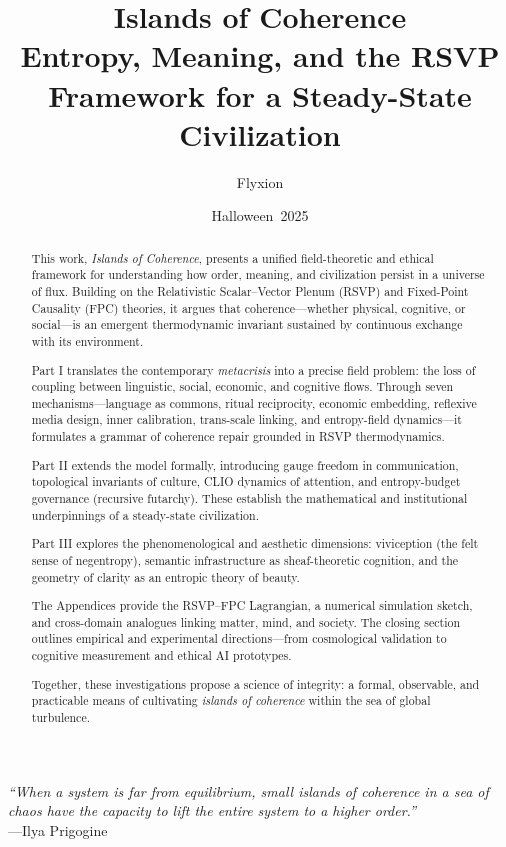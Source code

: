 \documentclass[12pt,a4paper]{article}
\title{\Huge\textbf{Islands of Coherence}\\
       \vspace{0.4em}
       \Large Entropy, Meaning, and the RSVP Framework for a Steady-State Civilization}
\author{Flyxion}
\date{Halloween~2025}
\begin{document}
\maketitle
\thispagestyle{empty}

\begin{center}
\emph{``When a system is far from equilibrium, small islands of coherence in a sea of chaos have the capacity to lift the entire system to a higher order.''}\\
—Ilya Prigogine \cite{prigogine1984order}
\end{center}

\newpage
\begin{abstract}
\noindent This work, \emph{Islands of Coherence}, presents a unified field-theoretic and ethical framework for understanding how order, meaning, and civilization persist in a universe of flux.
Building on the Relativistic Scalar–Vector Plenum (RSVP) and Fixed-Point Causality (FPC) theories, it argues that coherence—whether physical, cognitive, or social—is an emergent thermodynamic invariant sustained by continuous exchange with its environment.

Part I translates the contemporary \emph{metacrisis} into a precise field problem: the loss of coupling between linguistic, social, economic, and cognitive flows.
Through seven mechanisms—language as commons, ritual reciprocity, economic embedding, reflexive media design, inner calibration, trans-scale linking, and entropy-field dynamics—it formulates a grammar of coherence repair grounded in RSVP thermodynamics.

Part II extends the model formally, introducing gauge freedom in communication, topological invariants of culture, CLIO dynamics of attention, and entropy-budget governance (recursive futarchy).
These establish the mathematical and institutional underpinnings of a steady-state civilization.

Part III explores the phenomenological and aesthetic dimensions: viviception (the felt sense of negentropy), semantic infrastructure as sheaf-theoretic cognition, and the geometry of clarity as an entropic theory of beauty.

The Appendices provide the RSVP–FPC Lagrangian, a numerical simulation sketch, and cross-domain analogues linking matter, mind, and society.
The closing section outlines empirical and experimental directions—from cosmological validation to cognitive measurement and ethical AI prototypes.

Together, these investigations propose a science of integrity: a formal, observable, and practicable means of cultivating \emph{islands of coherence} within the sea of global turbulence.
\end{abstract}
\end{document}
